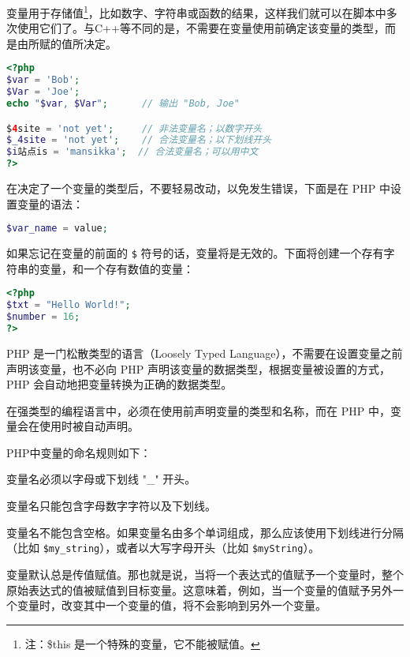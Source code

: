 变量用于存储值\footnote{注：\$this 是一个特殊的变量，它不能被赋值。}，比如数字、字符串或函数的结果，这样我们就可以在脚本中多次使用它们了。与C++等不同的是，不需要在变量使用前确定该变量的类型，而是由所赋的值所决定。

\begin{lstlisting}[language=PHP]
<?php
$var = 'Bob';
$Var = 'Joe';
echo "$var, $Var";      // 输出 "Bob, Joe"

$4site = 'not yet';     // 非法变量名；以数字开头
$_4site = 'not yet';    // 合法变量名；以下划线开头
$i站点is = 'mansikka';  // 合法变量名；可以用中文
?>
\end{lstlisting}


在决定了一个变量的类型后，不要轻易改动，以免发生错误，下面是在 PHP 中设置变量的语法：

\begin{lstlisting}[language=PHP]
$var_name = value;
\end{lstlisting}



如果忘记在变量的前面的 \texttt{\$} 符号的话，变量将是无效的。下面将创建一个存有字符串的变量，和一个存有数值的变量：


\begin{lstlisting}[language=PHP]
<?php
$txt = "Hello World!";
$number = 16;
?>
\end{lstlisting}


PHP 是一门松散类型的语言（Loosely Typed Language），不需要在设置变量之前声明该变量，也不必向 PHP 声明该变量的数据类型，根据变量被设置的方式，PHP 会自动地把变量转换为正确的数据类型。

在强类型的编程语言中，必须在使用前声明变量的类型和名称，而在 PHP 中，变量会在使用时被自动声明。

PHP中变量的命名规则如下：

\begin{compactitem}
\item 变量名必须以字母或下划线 "\_" 开头。
\item 变量名只能包含字母数字字符以及下划线。
\item 变量名不能包含空格。如果变量名由多个单词组成，那么应该使用下划线进行分隔（比如 \texttt{\$my\_string}），或者以大写字母开头（比如 \texttt{\$myString}）。
\end{compactitem}

变量默认总是传值赋值。那也就是说，当将一个表达式的值赋予一个变量时，整个原始表达式的值被赋值到目标变量。这意味着，例如，当一个变量的值赋予另外一个变量时，改变其中一个变量的值，将不会影响到另外一个变量。


